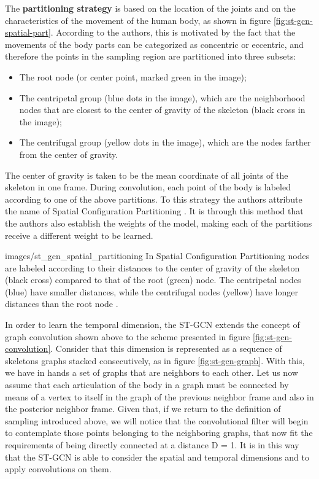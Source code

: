 The \textbf{partitioning strategy} is based on the location of the joints and on the characteristics of the movement of the human body, as shown in figure \ref{fig:st-gcn-spatial-part}. According to the authors, this is motivated by the fact that the movements of the body parts can be categorized as concentric or eccentric, and therefore the points in the sampling region are partitioned into three subsets:
    
\begin{itemize}
    \item The root node (or center point, marked green in the image);
    \item The centripetal group (blue dots in the image), which are the neighborhood nodes that are closest to the center of gravity of the skeleton (black cross in the image);
    \item The centrifugal group (yellow dots in the image), which are the nodes farther from the center of gravity.
\end{itemize}

The center of gravity is taken to be the mean coordinate of all joints of the skeleton in one frame. During convolution, each point of the body is labeled according to one of the above partitions. To this strategy the authors attribute the name of Spatial Configuration Partitioning \cite{st-gcn-2018}. It is through this method that the authors also establish the weights of the model, making each of the partitions receive a different weight to be learned.

    {images/st_gcn_spatial_partitioning}
    {In Spatial Configuration Partitioning nodes are labeled according to their distances to the center of gravity of the skeleton (black cross) compared to that of the root (green) node. The centripetal nodes (blue) have smaller distances, while the centrifugal nodes (yellow) have longer distances than the root node \cite[p. 5]{st-gcn-2018}.}
    
In order to learn the temporal dimension, the ST-GCN extends the concept of graph convolution shown above to the scheme presented in figure \ref{fig:st-gcn-convolution}. Consider that this dimension is represented as a sequence of skeletons graphs stacked consecutively, as in figure \ref{fig:st-gcn-graph}. With this, we have in hands a set of graphs that are neighbors to each other. Let us now assume that each articulation of the body in a graph must be connected by means of a vertex to itself in the graph of the previous neighbor frame and also in the posterior neighbor frame. Given that, if we return to the definition of sampling introduced above, we will notice that the convolutional filter will begin to contemplate those points belonging to the neighboring graphs, that now fit the requirements of being directly connected at a distance D = 1. It is in this way that the ST-GCN is able to consider the spatial and temporal dimensions and to apply convolutions on them.

